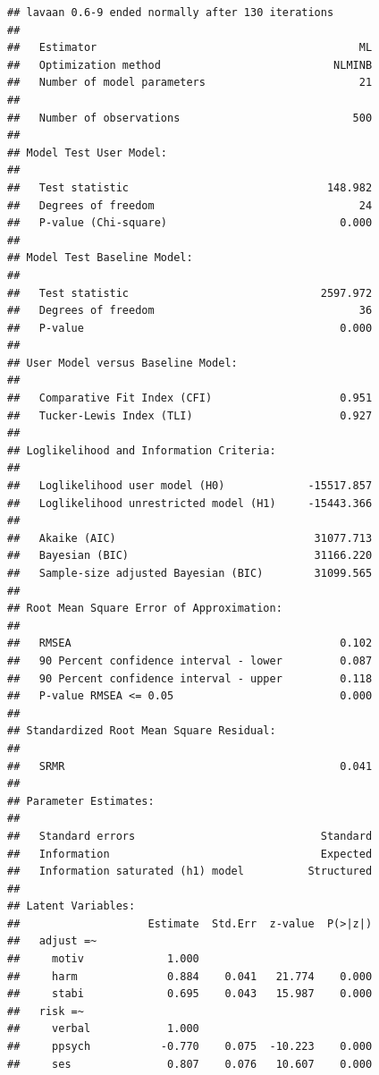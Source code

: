\documentclass[
]{article}
\begin{document}
\begin{verbatim}
## lavaan 0.6-9 ended normally after 130 iterations
## 
##   Estimator                                         ML
##   Optimization method                           NLMINB
##   Number of model parameters                        21
##                                                       
##   Number of observations                           500
##                                                       
## Model Test User Model:
##                                                       
##   Test statistic                               148.982
##   Degrees of freedom                                24
##   P-value (Chi-square)                           0.000
## 
## Model Test Baseline Model:
## 
##   Test statistic                              2597.972
##   Degrees of freedom                                36
##   P-value                                        0.000
## 
## User Model versus Baseline Model:
## 
##   Comparative Fit Index (CFI)                    0.951
##   Tucker-Lewis Index (TLI)                       0.927
## 
## Loglikelihood and Information Criteria:
## 
##   Loglikelihood user model (H0)             -15517.857
##   Loglikelihood unrestricted model (H1)     -15443.366
##                                                       
##   Akaike (AIC)                               31077.713
##   Bayesian (BIC)                             31166.220
##   Sample-size adjusted Bayesian (BIC)        31099.565
## 
## Root Mean Square Error of Approximation:
## 
##   RMSEA                                          0.102
##   90 Percent confidence interval - lower         0.087
##   90 Percent confidence interval - upper         0.118
##   P-value RMSEA <= 0.05                          0.000
## 
## Standardized Root Mean Square Residual:
## 
##   SRMR                                           0.041
## 
## Parameter Estimates:
## 
##   Standard errors                             Standard
##   Information                                 Expected
##   Information saturated (h1) model          Structured
## 
## Latent Variables:
##                    Estimate  Std.Err  z-value  P(>|z|)
##   adjust =~                                           
##     motiv             1.000                           
##     harm              0.884    0.041   21.774    0.000
##     stabi             0.695    0.043   15.987    0.000
##   risk =~                                             
##     verbal            1.000                           
##     ppsych           -0.770    0.075  -10.223    0.000
##     ses               0.807    0.076   10.607    0.000

\end{verbatim}
\end{document}
